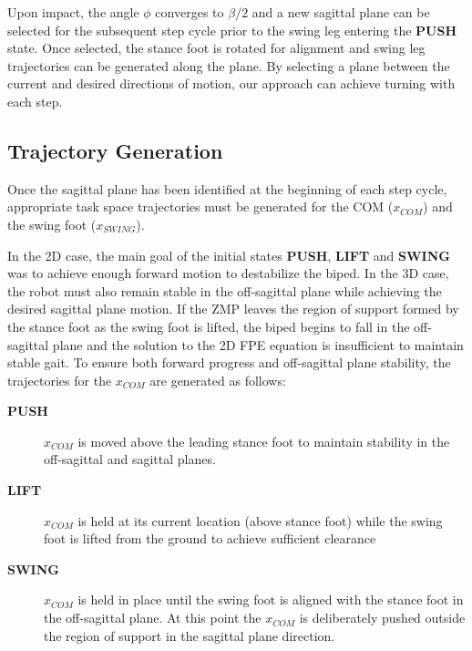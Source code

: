 Upon impact, the angle $\phi$ converges to $\beta/2$ and a new sagittal plane can be selected for the subsequent step cycle prior to the swing leg entering the \textbf{PUSH} state. Once selected, the stance foot is rotated for alignment and swing leg trajectories can be generated along the plane. By selecting a plane between the current and desired directions of motion, our approach can achieve turning with each step.


\subsection{Trajectory Generation} %
\label{sub:trajectory_generation}
Once the sagittal plane has been identified at the beginning of each step cycle, appropriate task space trajectories must be generated for the COM ($x_{COM}$) and the swing foot ($x_{SWING}$).


In the 2D case, the main goal of the initial states \textbf{PUSH}, \textbf{LIFT} and \textbf{SWING} was to achieve enough forward motion to destabilize the biped. In the 3D case, the robot must also remain stable in the off-sagittal plane while achieving the desired sagittal plane motion. If the ZMP leaves the region of support formed by the stance foot as the swing foot is lifted, the biped begins to fall in the off-sagittal plane and the solution to the 2D FPE equation is insufficient to maintain stable gait. To ensure both forward progress and off-sagittal plane stability, the trajectories for the $x_{COM}$ are generated as follows:

\begin{description}
	\item[\textbf{PUSH}] $x_{COM}$ is moved above the leading stance foot to maintain stability in the off-sagittal and sagittal planes.
	\item[\textbf{LIFT}] $x_{COM}$ is held at its current location (above stance foot) while the swing foot is lifted from the ground to achieve sufficient clearance
	\item[\textbf{SWING}] $x_{COM}$ is held in place until the swing foot is aligned with the stance foot in the off-sagittal plane. At this point the $x_{COM}$ is deliberately pushed outside the region of support in the sagittal plane direction.
\end{description}

